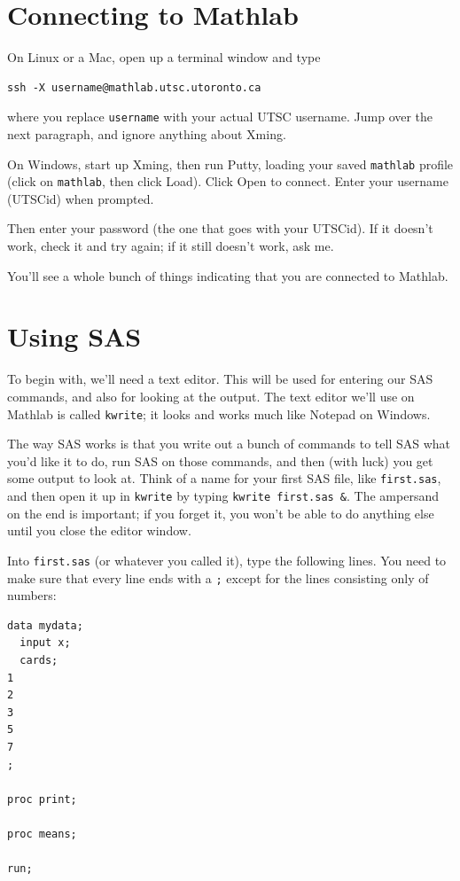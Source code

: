 \documentclass[11pt]{article}
\begin{document}
\section{Connecting to Mathlab}
\label{sec:runsas}

On Linux or a Mac,
open up a terminal window and type

\begin{verbatim}
ssh -X username@mathlab.utsc.utoronto.ca
\end{verbatim}

where you replace \verb-username- with your actual UTSC
username. Jump over the next paragraph, and ignore anything about Xming.

On Windows, start up Xming, then run Putty, loading your saved
\verb-mathlab- profile (click on \verb-mathlab-, then click
Load). Click Open to connect. Enter your username (UTSCid) when
prompted.

Then enter your password (the one that goes with your UTSCid). If it
doesn't work, check it and try again; if it still doesn't work, ask
me.

You'll see a whole bunch of things indicating that you are connected
to Mathlab. 


\section{Using SAS}
\label{UsingSAS}

To begin with, we'll need a text editor. This will be used for
entering our SAS commands, and also for looking at the output. The
text editor we'll use on Mathlab is called \texttt{kwrite}; it looks
and works much like Notepad on Windows.

The way SAS works is that you write out a bunch of commands to tell
SAS what you'd like it to do, run SAS on those commands, and then
(with luck) you get some output to look at. Think of a name for your
first SAS file, like \texttt{first.sas}, and then open it up in
\texttt{kwrite} by typing \texttt{kwrite~first.sas~\&}. The ampersand
on the end is important; if you forget it, you won't be able to do
anything else until you close the editor window.

Into \texttt{first.sas} (or whatever you called it), type the
following lines. You need to make sure that every line ends with a
\texttt{;} except for the lines consisting only of numbers:

\filbreak
\begin{verbatim}
data mydata;
  input x;
  cards;
1
2
3
5
7
;

proc print;

proc means;

run;
\end{verbatim}
\filbreak
\end{document}
